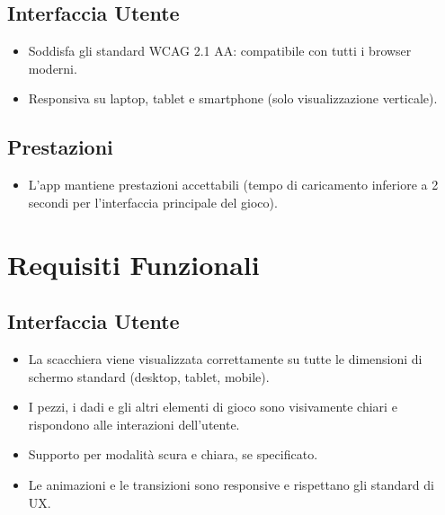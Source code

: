 \documentclass{article}
\begin{document}
\subsection{Interfaccia Utente}
\begin{itemize}
    \item Soddisfa gli standard WCAG 2.1 AA: compatibile con tutti i browser moderni.
    \item Responsiva su laptop, tablet e smartphone (solo visualizzazione verticale).
\end{itemize}

\subsection{Prestazioni}
\begin{itemize}
    \item L'app mantiene prestazioni accettabili (tempo di caricamento inferiore a 2 secondi per l'interfaccia principale del gioco).
\end{itemize}

\section{Requisiti Funzionali}

\subsection{Interfaccia Utente}
\begin{itemize}
    \item La scacchiera viene visualizzata correttamente su tutte le dimensioni di schermo standard (desktop, tablet, mobile).
    \item I pezzi, i dadi e gli altri elementi di gioco sono visivamente chiari e rispondono alle interazioni dell'utente.
    \item Supporto per modalità scura e chiara, se specificato.
    \item Le animazioni e le transizioni sono responsive e rispettano gli standard di UX.
\end{itemize}
\end{document}
